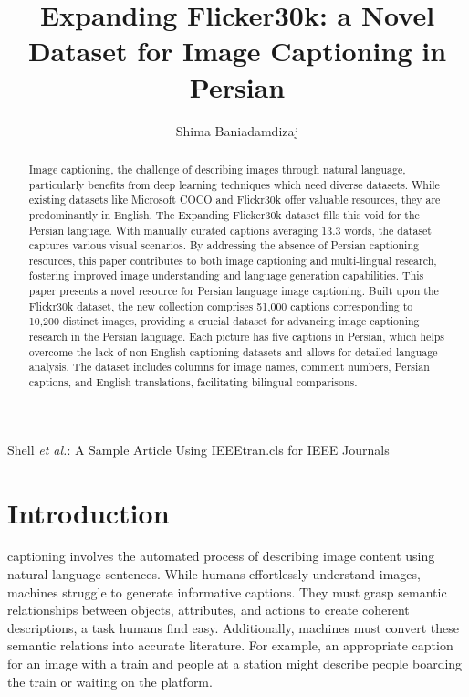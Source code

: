 \documentclass[lettersize,journal]{IEEEtran}
\begin{document}
\title{Expanding Flicker30k: a Novel Dataset for Image Captioning in Persian}

\author{Shima Baniadamdizaj}

%
{Shell \MakeLowercase{\textit{et al.}}: A Sample Article Using IEEEtran.cls for IEEE Journals}


\maketitle

\begin{abstract}
  Image captioning, the challenge of describing images through natural language, particularly benefits from deep learning techniques which need diverse datasets. While existing datasets like Microsoft COCO and Flickr30k offer valuable resources, they are predominantly in English. The Expanding Flicker30k dataset fills this void for the Persian language. With manually curated captions averaging 13.3 words, the dataset captures various visual scenarios. By addressing the absence of Persian captioning resources, this paper contributes to both image captioning and multi-lingual research, fostering improved image understanding and language generation capabilities.
  This paper presents a novel resource for Persian language image captioning. Built upon the Flickr30k dataset, the new collection comprises 51,000 captions corresponding to 10,200 distinct images, providing a crucial dataset for advancing image captioning research in the Persian language. Each picture has five captions in Persian, which helps overcome the lack of non-English captioning datasets and allows for detailed language analysis. The dataset includes columns for image names, comment numbers, Persian captions, and English translations, facilitating bilingual comparisons.
\end{abstract}


\section{Introduction}
 captioning involves the automated process of describing image content using natural language sentences. While humans effortlessly understand images, machines struggle to generate informative captions. They must grasp semantic relationships between objects, attributes, and actions to create coherent descriptions, a task humans find easy. Additionally, machines must convert these semantic relations into accurate literature. For example, an appropriate caption for an image with a train and people at a station might describe people boarding the train or waiting on the platform.
\end{document}

